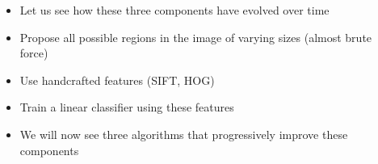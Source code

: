 \begin{frame}
	\begin{columns}
		\begin{overlayarea}{\textwidth}{\textheight}
			
			
		\end{overlayarea}
		\begin{overlayarea}{\textwidth}{\textheight}
			\begin{itemize}
				\justifying
				\item<1-> Let us see how these three components have evolved over time
				\item<2-> Propose all possible regions in the image of varying sizes (almost brute force)
				\item<3-> Use handcrafted features (SIFT, HOG)
				\item<4-> Train a linear classifier using these features
				\item<5-> We will now see three algorithms that progressively improve these components 
			\end{itemize}
		\end{overlayarea}
	\end{columns}
\end{frame}

